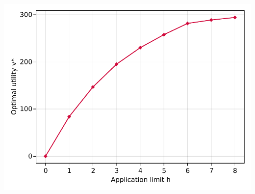 \documentclass[11pt,slidestop,compress,mathserif,notheorems]{beamer}
\theoremstyle{definition}
\theoremstyle{definition}
\begin{document}
\begin{frame}[plain]
\begin{center}
 \includegraphics[height=\textheight]{./plots/h_v-example.pdf}
\end{center}
\end{frame}
\end{document}
